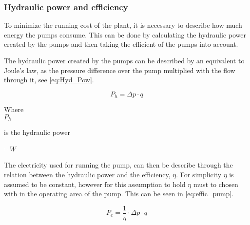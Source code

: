 \subsubsection*{Hydraulic power and efficiency}
To minimize the running cost of the plant, it is necessary to describe how much energy the pumps consume. This can be done by calculating the hydraulic power created by the pumps and then taking the efficient of the pumps into account. 

The hydraulic power created by the pumps can be described by an equivalent to Joule's law, as the pressure difference over the pump multiplied with the flow through it, see \eqref{eq:Hyd_Pow}.

\begin{equation}
P_h = \Delta p \cdot q 
\label{eq:Hyd_Pow}
\end{equation}

\begin{minipage}[t]{0.20\textwidth}
Where\\
\hspace*{8mm} $P_h$
\end{minipage}
\begin{minipage}[t]{0.68\textwidth}
\vspace*{2mm}
is the hydraulic power
\end{minipage}
\begin{minipage}[t]{0.10\textwidth}
\vspace*{2mm}
\textcolor{White}{te}$\unit{W}$\\
\end{minipage}	

The electricity used for running the pump, can then be describe through the relation between the hydraulic power and the efficiency, $\eta$. For simplicity $\eta$ is assumed to be constant, however for this assumption to hold $\eta$ must to chosen with in the operating area of the pump. This can be seen in \eqref{eq:effic_pump}.

\begin{equation}
P_e = \frac{1}{\eta}\cdot\Delta p \cdot q 
\label{eq:effic_pump}
\end{equation}

